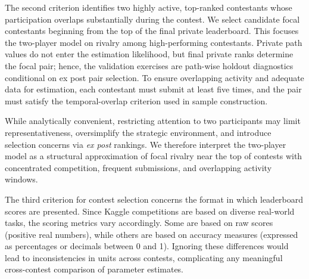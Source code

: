 \documentclass[mnsc]{informs3}
\begin{document}
The second criterion identifies two highly active, top-ranked contestants whose participation overlaps substantially during the contest. We select candidate focal contestants beginning from the top of the final private leaderboard. This focuses the two-player model on rivalry among high-performing contestants. Private path values do not enter the estimation likelihood, but final private ranks determine the focal pair; hence, the validation exercises are path-wise holdout diagnostics conditional on ex post pair selection.
To ensure overlapping activity and adequate data for estimation, each contestant must submit at least five times, and the pair must satisfy the temporal-overlap criterion used in sample construction.

While analytically convenient, restricting attention to two participants may limit representativeness, oversimplify the strategic environment, and introduce selection concerns via \textit{ex post} rankings.
We therefore interpret the two-player model as a structural approximation of focal rivalry near the top of contests with concentrated competition, frequent submissions, and overlapping activity windows.

The third criterion for contest selection concerns the format in which leaderboard scores are presented.
Since Kaggle competitions are based on diverse real-world tasks, the scoring metrics vary accordingly.
Some are based on raw scores (positive real numbers), while others are based on accuracy measures (expressed as percentages or decimals between 0 and 1).
Ignoring these differences would lead to inconsistencies in units across contests, complicating any meaningful cross-contest comparison of parameter estimates.
\end{document}
